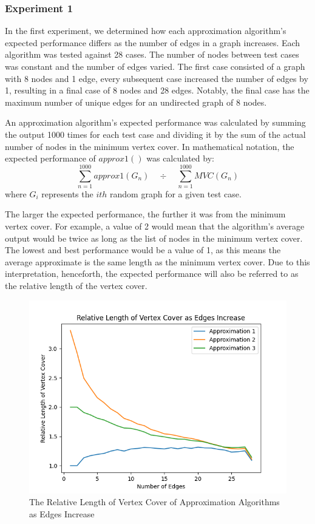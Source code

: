 \documentclass[titlepage]{article}
\begin{document}
\subsubsection{Experiment 1}
In the first experiment, we determined how each approximation algorithm's expected performance differs as the number of edges in a graph increases. Each algorithm was tested against 28 cases. The number of nodes between test cases was constant and the number of edges varied. The first case consisted of a graph with 8 nodes and 1 edge, every subsequent case increased the number of edges by 1, resulting in a final case of 8 nodes and 28 edges. Notably, the final case has the maximum number of unique edges for an undirected graph of 8 nodes.

An approximation algorithm's expected performance was calculated by summing the output 1000 times for each test case and dividing it by the sum of the actual number of nodes in the minimum vertex cover. In mathematical notation, the expected performance of $approx1()$ was calculated by:
\[ \sum_{n=1}^{1000} approx1(G_n) \quad \div \quad \sum_{n=1}^{1000} MVC(G_n)\]
where $G_i$ represents the $ith$ random graph for a given test case.

The larger the expected performance, the further it was from the minimum vertex cover. For example, a value of 2 would mean that the algorithm's average output would be twice as long as the list of nodes in the minimum vertex cover. The lowest and best performance would be a value of 1, as this means the average approximate is the same length as the minimum vertex cover. Due to this interpretation, henceforth, the expected performance will also be referred to as the relative length of the vertex cover.


\begin{figure}[H]
    \centering
    \includegraphics[width=0.8\linewidth]{experiment_3_1.png}
    \caption{The Relative Length of Vertex Cover of Approximation Algorithms as Edges Increase}
    \label{fig:experiment_3_1}
\end{figure}
\end{document}
